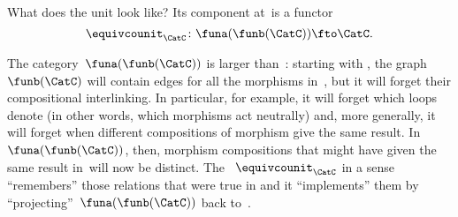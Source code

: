 \begin{example}
    What does the unit look like?
    Its component at~\CatC is a functor
    \begin{equation}\label{eq:cat-graph-adjunction-co-unit}
        \equivcounit_{\CatC} \colon \funa(\funb(\CatC)) \fto \CatC.
    \end{equation}

    The category~$\funa(\funb(\CatC))$ is larger than~\CatC: starting with \CatC, the graph~$\funb(\CatC)$ will contain edges for all the morphisms in~\CatC, but it will forget their compositional interlinking.
    In particular, for example, it will forget which loops denote  (in other words, which morphisms act neutrally) and, more generally, it will forget when different compositions of morphism give the same result.
    In~$\funa(\funb(\CatC))$, then, morphism compositions that might have given the same result in~\CatC will now be distinct.
    The ~$\equivcounit_{\CatC}$ in a sense ``remembers'' those relations that were true in \CatC and it ``implements'' them by ``projecting''~$\funa(\funb(\CatC))$ back to~\CatC.
\end{example}

